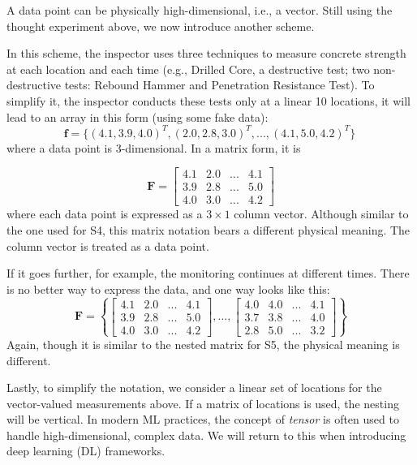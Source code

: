 \documentclass[12pt]{article}
\begin{document}
A data point can be physically high-dimensional, i.e., a vector. Still using the thought experiment above, we now introduce another scheme.

\begin{ex-box}
\noindent {}

In this scheme, the inspector uses three techniques to measure concrete strength at each location and each time (e.g., Drilled Core, a destructive test; two non-destructive tests: Rebound Hammer and Penetration Resistance Test). To simplify it, the inspector conducts these tests only at a linear 10 locations, it will lead to an array in this form (using some fake data):
\[
\bm{f} = \{ (4.1, 3.9, 4.0)^T, (2.0, 2.8, 3.0)^T, ..., (4.1, 5.0, 4.2)^T \}\
\]
where a data point is 3-dimensional. In a matrix form, it is 

\begin{equation*}
\bm{F} = 
\begin{bmatrix}
4.1 & 2.0 & ... & 4.1\\
3.9 & 2.8 & ... & 5.0\\
4.0 & 3.0 & ... & 4.2
\end{bmatrix}
\end{equation*}
where each data point is expressed as a $3\times 1$ column vector. Although similar to the one used for S4, this matrix notation bears a different physical meaning. The column vector is treated as a data point. 

If it goes further, for example, the monitoring continues at different times. There is no better way to express the data, and one way looks like this:
\begin{equation*}
\bm{F} = 
\left\{\begin{bmatrix}
4.1 & 2.0 & ... & 4.1\\
3.9 & 2.8 & ... & 5.0\\
4.0 & 3.0 & ... & 4.2
\end{bmatrix},
...,
\begin{bmatrix}
4.0 & 4.0 & ... & 4.1\\
3.7 & 3.8 & ... & 4.0\\
2.8 & 5.0 & ... & 3.2
\end{bmatrix} \right\}
\end{equation*}
Again, though it is similar to the nested matrix for S5, the physical meaning is different.
\end{ex-box}

Lastly, to simplify the notation, we consider a linear set of locations for the vector-valued measurements above. If a matrix of locations is used, the nesting will be vertical. In modern ML practices, the concept of \textit{tensor} is often used to handle high-dimensional, complex data. We will return to this when introducing deep learning (DL) frameworks.
\end{document}
